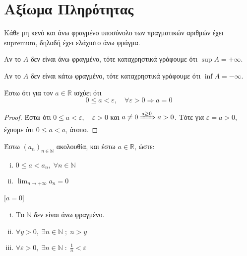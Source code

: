 \documentclass[main.tex]{subfiles}
\begin{document}
\section{Αξίωμα Πληρότητας}

Κάθε μη κενό και άνω φραγμένο υποσύνολο των πραγματικών αριθμών έχει 
supremum, δηλαδή έχει ελάχιστο άνω φράγμα.

\begin{rem}
\item {}
  \begin{myitemize}
    \item Αν το $A$ δεν είναι άνω φραγμένο, τότε καταχρηστικά  γράφουμε ότι 
      $ \sup A = + \infty $.
    \item Αν το $A$ δεν είναι κάτω φραγμένο, τότε καταχρηστικά  γράφουμε ότι 
      $ \inf A = - \infty $.
  \end{myitemize}
\end{rem}

\begin{mypropbox}
\label{prop:epsilonprot}
  Έστω ότι για τον $a \in \mathbb{R}$ ισχύει ότι 
  \[
    0 \leq a < \varepsilon, \quad \forall \varepsilon >0 \Rightarrow a =0 
\]
\end{mypropbox}

\begin{proof}
\item {}
  Έστω ότι $ 0 \leq a < \varepsilon, \quad \varepsilon >0 $ και 
  $ a \neq 0 \xRightarrow{a \geq 0} a > 0$. Τότε για $ \varepsilon = 
  a > 0$, έχουμε ότι $ 0 \leq a < a $, άτοπο.
\end{proof}


\begin{mypropbox}
  Έστω $ (a_{n})_{n \in \mathbb{N}} $ ακολουθία, και έστω $ a \in \mathbb{R} $, ώστε:
  \vspace{\baselineskip}
  \begin{minipage}{0.3\textwidth}
    \begin{enumerate}[(i)]
      \item $ 0 \leq a < a_{n}, \; \forall n \in \mathbb{N} $ \hfill {}
      \item $ \lim_{n \to +\infty} a_{n} = 0 $ \hfill {}
    \end{enumerate}
[$ a = 0 $]
  \end{minipage}
\end{mypropbox}

\begin{mypropbox}
  \begin{enumerate}[(i)]
    \item Το $ \mathbb{N} $ δεν είναι άνω φραγμένο.
    \item $ \forall y > 0, \; \exists n \in \mathbb{N} \; ; \; n > y$
    \item $ \forall \varepsilon >0, \; \exists n \in \mathbb{N} \; : 
      \; \frac{1}{n} < \varepsilon$
\end{enumerate}
\end{mypropbox}
\end{document}
